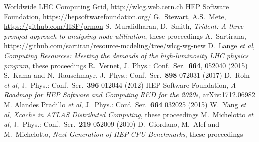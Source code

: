 \begin{thebibliography}{}
Worldwide LHC Computing Grid, \url{http://wlcg.web.cern.ch}
HEP Software Foundation, \url{https://hepsoftwarefoundation.org/}
G.~Stewart, A.S.~Mete, \url{https://github.com/HSF/prmon}
S.~Muralidharan, D.~Smith, \textit{Trident: A three pronged approach to analysing node utilisation}, these proceedings
A.~Sartirana, \url{https://github.com/sartiran/resource-modeling/tree/wlcg-wg-new}
D.~Lange {\em et al}, \textit{Computing Resources: Meeting the demands of the high-luminosity LHC physics program}, these proceedings
R.~Vernet, J.\ Phys.: Conf.\ Ser.\ \textbf{664}, 052040 (2015)
S.~Kama and N.~Rauschmayr, J.\ Phys.: Conf.\ Ser.\ {\bf 898} 072031 (2017)
D.~Rohr {\em et al}, J.\ Phys.: Conf.\ Ser.\ \textbf{396} 012044 (2012)
HEP Software Foundation, \textit{A Roadmap for HEP Software and Computing R\&D for the 2020s}, arXiv:1712.06982
M. Alandes Pradillo {\em et al}, J.\ Phys.: Conf.\ Ser.\ \textbf{664} 032025 (2015)
W.~Yang {\em et al}, \textit{Xcache in ATLAS Distributed Computing}, these proceedings
M.~Michelotto {\em et al}, J.\ Phys.: Conf.\ Ser.\ \textbf{219} 052009 (2010)
D.~Giordano, M.~Alef and M.~Michelotto, \textit{Next Generation of HEP CPU Benchmarks}, these proceedings
\end{thebibliography}
